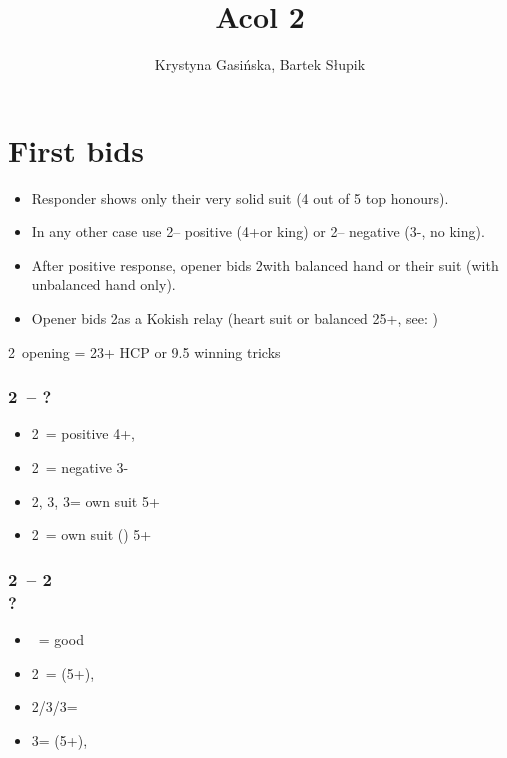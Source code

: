 \documentclass[12pt, a4paper]{article}
\title{Acol 2\clubsuit}
\author{Krystyna Gasińska, Bartek Słupik}
\begin{document}
\maketitle

\section{First bids}
\begin{itemize}
    \item Responder shows only their very solid suit (4 out of 5 top honours).
    \item In any other case use 2\diams -- positive (4+\hcp or king) or 2\hearts -- negative (3-, no king).
    \item After positive response, opener bids 2\nt with balanced hand or their suit (with unbalanced hand only).
    \item Opener bids 2\hearts as a Kokish relay (heart suit or balanced 25+, see: {})
\end{itemize}


2\clubs\ opening = 23+ HCP or 9.5 winning tricks

\subsubsection*{2\clubs\ -- ?}
\begin{itemize}
    \item 2\diams\ = positive 4+, \gf
    \item 2\hearts\ = negative 3-
    \item 2\spades, 3\clubs, 3\diams = own suit 5+
    \item 2\nt\ = own suit (\hearts) 5+
\end{itemize}

\subsubsection*{2\clubs\ -- 2\hearts \\ ?}
\begin{itemize}
    \item \pass\ = good \hearts
    \item 2\spades\ = \nat (5+), \fonce
    \item 2\nt/3\clubs/3\diams = \nf
    \item 3\hearts = \nat (5+), \gf
\end{itemize}
\end{document}
